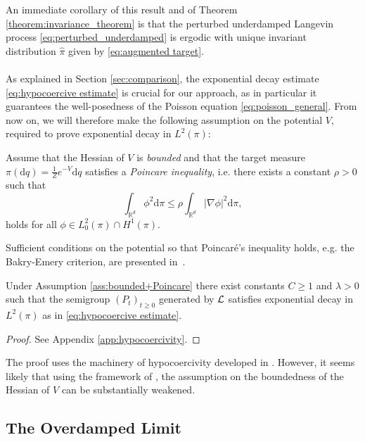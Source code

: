 An immediate corollary of this result and of Theorem \ref{theorem:invariance_theorem} is that the perturbed underdamped Langevin process \eqref{eq:perturbed_underdamped} is ergodic with unique invariant distribution $\widehat{\pi}$ given by \eqref{eq:augmented target}.
\\\\
As explained in Section \ref{sec:comparison}, the exponential decay estimate \eqref{eq:hypocoercive estimate} is crucial for our approach, as in particular it guarantees the well-posedness of the Poisson equation \eqref{eq:poisson_general}. 
From now on, we will therefore make the following assumption on the potential $V,$ required to prove exponential decay in $L^2(\pi)$:

\begin{assumption}
	\label{ass:bounded+Poincare}
	Assume that the Hessian of $V$ is \emph{bounded} and that the target measure $\pi(\mathrm{d}q) = \frac{1}{Z}e^{-V}\mathrm{d}q$ satisfies a \emph{Poincare inequality}, i.e. there exists a constant $\rho>0$ such that 
	\begin{equation}
	\int_{\mathbb{R}^d}\phi^2\mathrm{d}\pi \le \rho \int_{\mathbb{R}^d} \vert \nabla \phi \vert ^2 \mathrm{d}\pi, 
	\end{equation}
	holds for all $\phi \in L_{0}^2(\pi)\cap H^1(\pi)$.
\end{assumption}
Sufficient conditions on the potential so that Poincar\'{e}'s inequality holds, e.g. the Bakry-Emery criterion, are presented in~\cite{bakry2013analysis}.
\begin{theorem}
	\label{theorem:Hypocoercivity}Under Assumption \ref{ass:bounded+Poincare} there exist constants $C\ge 1$ and $\lambda>0$ such that the semigroup $(P_t)_{t\ge0}$ generated by $\operatorname{\mathcal{L}}$ satisfies exponential decay in $L^2(\pi)$ as in \eqref{eq:hypocoercive estimate}.
\end{theorem}
\begin{proof}
	See Appendix \ref{app:hypocoercivity}.
\end{proof}
\begin{remark}
	The proof uses the machinery of hypocoercivity developed in \cite{villani2009hypocoercivity}.
	However, it seems likely that using the framework of \cite{DolbeaultMouhotSchmeiser2015},
	the assumption on the boundedness of the Hessian of $V$ can be substantially
	weakened.
\end{remark}

\subsection{The Overdamped Limit}
\label{sec:overdamped}

